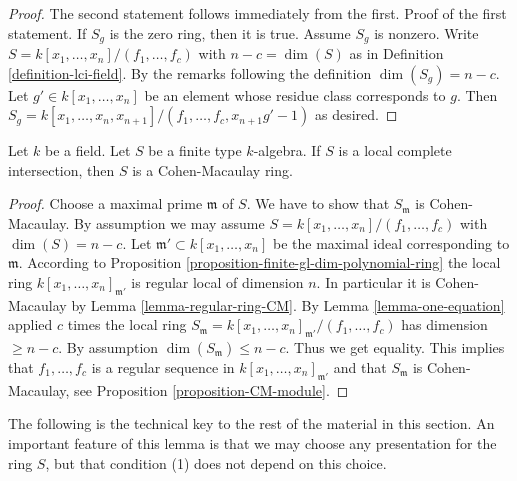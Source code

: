\begin{proof}
The second statement follows immediately from the first.
Proof of the first statement. If $S_g$ is the zero ring,
then it is true. Assume $S_g$ is nonzero.
Write $S = k[x_1, \ldots, x_n]/(f_1, \ldots, f_c)$
with $n - c = \dim(S)$ as in Definition \ref{definition-lci-field}.
By the remarks following the definition $\dim(S_g) = n - c$. Let
$g' \in k[x_1, \ldots, x_n]$ be an element whose residue class
corresponds to $g$. Then
$S_g =  k[x_1, \ldots, x_n, x_{n + 1}]/(f_1, \ldots, f_c, x_{n + 1}g' - 1)$
as desired.
\end{proof}

\begin{lemma}
\label{lemma-lci-CM}
Let $k$ be a field. Let $S$ be a finite type $k$-algebra.
If $S$ is a local complete intersection, then
$S$ is a Cohen-Macaulay ring.
\end{lemma}

\begin{proof}
Choose a maximal prime $\mathfrak m$ of $S$.
We have to show that $S_\mathfrak m$ is Cohen-Macaulay.
By assumption we may assume $S = k[x_1, \ldots, x_n]/(f_1, \ldots, f_c)$
with $\dim(S) = n - c$. Let $\mathfrak m' \subset k[x_1, \ldots, x_n]$
be the maximal ideal corresponding to $\mathfrak m$.
According to Proposition \ref{proposition-finite-gl-dim-polynomial-ring}
the local ring
$k[x_1, \ldots, x_n]_{\mathfrak m'}$ is regular local of
dimension $n$. In particular it is Cohen-Macaulay by
Lemma \ref{lemma-regular-ring-CM}.
By Lemma \ref{lemma-one-equation} applied $c$ times the local ring
$S_{\mathfrak m} = k[x_1, \ldots, x_n]_{\mathfrak m'}/(f_1, \ldots, f_c)$
has dimension $\geq n - c$. By assumption $\dim(S_{\mathfrak m}) \leq n - c$.
Thus we get equality. This implies that $f_1, \ldots, f_c$ is a regular
sequence in $k[x_1, \ldots, x_n]_{\mathfrak m'}$ and that
$S_{\mathfrak m}$ is Cohen-Macaulay, see Proposition
\ref{proposition-CM-module}.
\end{proof}

\noindent
The following is the technical key to the rest of the material in this
section. An important feature of this lemma is that we may choose any
presentation for the ring $S$, but that condition (1) does not depend
on this choice.

